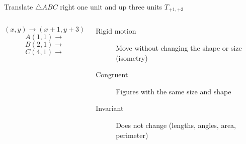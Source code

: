 \begin{frame}{Translate $\triangle ABC$ right one unit and up three units $T_{+1,+3}$}
    \begin{columns}
        $$(x,y) \rightarrow (x+1,y+3)$$
        $$A(1,1) \rightarrow$$
        $$B(2,1) \rightarrow$$
        $$C(4,1) \rightarrow$$

        \begin{description}
            \item[Rigid motion] Move without changing the shape or size (isometry)
            \item[Congruent] Figures with the same size and shape
            \item[Invariant] Does not change (lengths, angles, area, perimeter)
          \end{description}
    \begin{flushright}
    \end{flushright}
\end{columns}
\end{frame}


